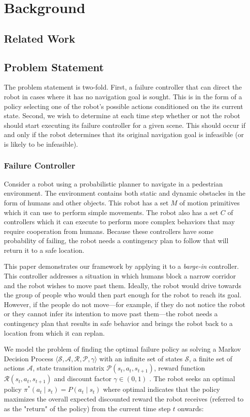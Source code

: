 \documentclass[letterpaper]{article}
\begin{document}
	\section{Background}
		\subsection{Related Work}
		\subsection{Problem Statement}
			The problem statement is two-fold. First, a failure controller that can direct the robot in cases where it has no navigation goal is sought. This is in the form of a policy selecting one of the robot's possible actions conditioned on the its current state. Second, we wish to determine at each time step whether or not the robot should start executing its failure controller for a given scene. This should occur if and only if the robot determines that its original navigation goal is infeasible (or is likely to be infeasible).
			
			\subsubsection{Failure Controller}
				Consider a robot using a probabilistic planner to navigate in a pedestrian environment. The environment contains both static and dynamic obstacles in the form of humans and other objects. This robot has a set $M$ of motion primitives which it can use to perform simple movements. The robot also has a set $C$ of controllers which it can execute to perform more complex behaviors that may require cooperation from humans. Because these controllers have some probability of failing, the robot needs a contingency plan to follow that will return it to a safe location. 
				
				This paper demonstrates our framework by applying it to a \textit{barge-in} controller. This controller addresses a situation in which humans block a narrow corridor and the robot wishes to move past them. Ideally, the robot would drive towards the group of people who would then part enough for the robot to reach its goal. However, if the people do not move---for example, if they do not notice the robot or they cannot infer its intention to move past them---the robot needs a contingency plan that results in safe behavior and brings the robot back to a location from which it can replan.
				
				We model the problem of finding the optimal failure policy as solving a Markov Decision Process $\langle\mathcal{S}, \mathcal{A}, \mathcal{R}, \mathcal{P}, \gamma\rangle$ with an infinite set of states $\mathcal{S}$, a finite set of actions $\mathcal{A}$, state transition matrix $\mathcal{P}(s_t, a_t, s_{t+1})$, reward function $\mathcal{R}(s_t, a_t, s_{t+1})$ and discount factor $\gamma \in (0, 1)$ \cite{suttonandbarto}. The robot seeks an optimal policy $\pi^*(a_t \mid s_t)=P(a_t \mid s_t)$ where optimal indicates that the policy maximizes the overall expected discounted reward the robot receives (referred to as the "return" of the policy) from the current time step $t$ onwards:
				
\end{document}
